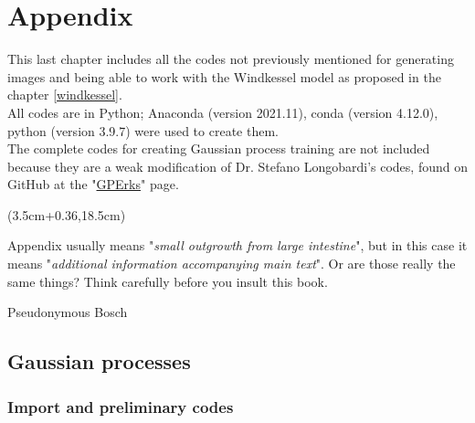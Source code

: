 \chapter*{Appendix}




This last chapter includes all the codes not previously mentioned for generating images and being able to work with the Windkessel model as proposed in the chapter \ref{windkessel}.\\
All codes are in Python; Anaconda (version 2021.11), conda (version 4.12.0), python (version 3.9.7) were used to create them.\\
The complete codes for creating Gaussian process training are not included because they are a weak modification of Dr. Stefano Longobardi's codes, found on GitHub at the "\href{https://github.com/stelong/GPErks}{GPErks}" page.



\begin{textblock*}{0.64\textwidth}(3.5cm+0.36\textwidth,18.5cm)
   \epigraph{Appendix usually means "\textit{small outgrowth from large intestine}", but in this case it means "\textit{additional information accompanying main text}". Or are those really the same things? Think carefully before you insult this book.}{Pseudonymous Bosch}
\end{textblock*}


\newpage

\section*{Gaussian processes}

\subsection*{Import and preliminary codes}





